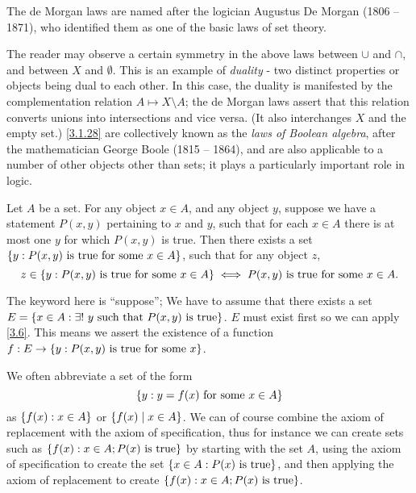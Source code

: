 \begin{rmk}\label{3.1.29}
	The de Morgan laws are named after the logician Augustus De Morgan (1806 -- 1871), who identified them as one of the basic laws of set theory.
\end{rmk}

\begin{rmk}\label{3.1.30}
	The reader may observe a certain symmetry in the above laws between \(\cup\) and \(\cap\), and between \(X\) and \(\emptyset\).
	This is an example of \emph{duality} - two distinct properties or objects being dual to each other.
	In this case, the duality is manifested by the complementation relation \(A \mapsto X \setminus A\);
	the de Morgan laws assert that this relation converts unions into intersections and vice versa.
	(It also interchanges \(X\) and the empty set.)
	\cref{3.1.28} are collectively known as the \emph{laws of Boolean algebra}, after the mathematician George Boole (1815 -- 1864), and are also applicable to a number of other objects other than sets;
	it plays a particularly important role in logic.
\end{rmk}

\begin{ax}[Replacement]\label{3.6}
	Let \(A\) be a set.
	For any object \(x \in A\), and any object \(y\), suppose we have a statement \(P(x, y)\) pertaining to \(x\) and \(y\), such that for each \(x \in A\) there is at most one \(y\) for which \(P(x, y)\) is true.
	Then there exists a set \(\left\lbrace y : P(x, y) \text{ is true for some } x \in A\right\rbrace\), such that for any object \(z\),
	\[
		z \in \left\lbrace y: P(x, y) \text{ is true for some } x \in A\right\rbrace \iff P(x, y) \text{ is true for some } x \in A.
	\]
\end{ax}

\begin{note}
	The keyword here is ``suppose'';
	We have to assume that there exists a set \(E = \left\lbrace x \in A : \exists!\ y \text{ such that } P(x, y) \text{ is true}\right\rbrace\).
	\(E\) must exist first so we can apply \cref{3.6}.
	This means we assert the existence of a function \(f : E \to \left\lbrace y : P(x, y) \text{ is true for some } x\right\rbrace\).
\end{note}

\begin{note}
	We often abbreviate a set of the form
	\[
		\left\lbrace y : y = f(x) \text{ for some } x \in A\right\rbrace
	\]
	as \(\left\lbrace f(x) : x \in A\right\rbrace\) or \(\left\lbrace f(x) \mid x \in A\right\rbrace\).
	We can of course combine the axiom of replacement with the axiom of specification, thus for instance we can create sets such as \(\left\lbrace f(x) : x \in A; P(x) \text{ is true}\right\rbrace\) by starting with the set \(A\), using the axiom of specification to create the set \(\left\lbrace x \in A : P(x) \text{ is true}\right\rbrace\), and then applying the axiom of replacement to create \(\left\lbrace f(x) : x \in A; P(x) \text{ is true}\right\rbrace\).
\end{note}

